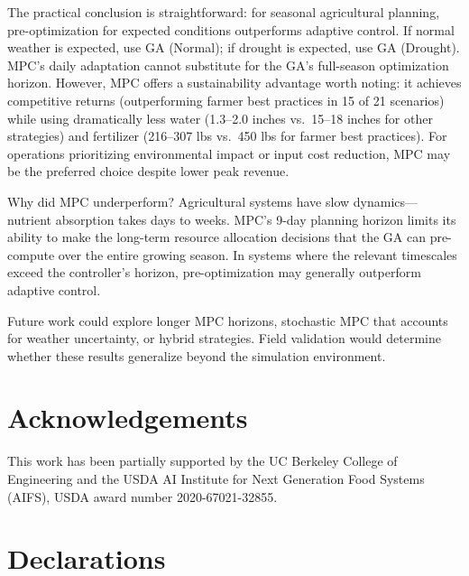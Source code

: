 \documentclass[preprint,12pt]{elsarticle}
\begin{document}
The practical conclusion is straightforward: for seasonal agricultural planning, pre-optimization for expected conditions outperforms adaptive control. If normal weather is expected, use GA (Normal); if drought is expected, use GA (Drought). MPC's daily adaptation cannot substitute for the GA's full-season optimization horizon. However, MPC offers a sustainability advantage worth noting: it achieves competitive returns (outperforming farmer best practices in 15 of 21 scenarios) while using dramatically less water (1.3--2.0 inches vs.\ 15--18 inches for other strategies) and fertilizer (216--307 lbs vs.\ 450 lbs for farmer best practices). For operations prioritizing environmental impact or input cost reduction, MPC may be the preferred choice despite lower peak revenue.

Why did MPC underperform? Agricultural systems have slow dynamics---nutrient absorption takes days to weeks. MPC's 9-day planning horizon limits its ability to make the long-term resource allocation decisions that the GA can pre-compute over the entire growing season. In systems where the relevant timescales exceed the controller's horizon, pre-optimization may generally outperform adaptive control.

Future work could explore longer MPC horizons, stochastic MPC that accounts for weather uncertainty, or hybrid strategies. Field validation would determine whether these results generalize beyond the simulation environment.

\section*{Acknowledgements}

This work has been partially supported by the UC Berkeley College of Engineering and the USDA AI Institute for Next Generation Food Systems (AIFS), USDA award number 2020-67021-32855.

\section*{Declarations}
\end{document}
